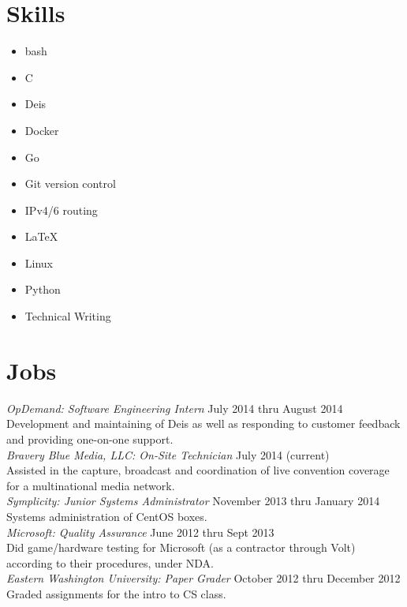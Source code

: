 \documentclass[line, margin]{res}
\begin{document}
\begin{resume}
	\section{Skills}
	\begin{multicols}{3}
		\begin{itemize}
			\item bash
			\item C
			\item Deis
			\item Docker
			\item Go
			\item Git version control
			\item IPv4/6 routing
			\item \LaTeX
			\item Linux
			\item Python
			\item Technical Writing
		\end{itemize}
	\end{multicols}

	\section{Jobs}
	\textit{OpDemand: Software Engineering Intern} \hfill July 2014 thru August 2014\\
	Development and maintaining of Deis as well as responding to customer
	feedback and providing one-on-one support. \\ [6pt]
	\textit{Bravery Blue Media, LLC: On-Site Technician} \hfill July 2014 (current) \\
	Assisted in the capture, broadcast and coordination of live convention
	coverage for a multinational media network. \\ [6pt]
	\textit{Symplicity: Junior Systems Administrator} \hfill November 2013 thru January 2014 \\
	Systems administration of CentOS boxes. \\ [6pt]
	\textit{Microsoft: Quality Assurance} \hfill June 2012 thru Sept 2013 \\
	Did game/hardware testing for Microsoft (as a contractor through Volt)
	according to their procedures, under NDA. \\ [6pt]
	\textit{Eastern Washington University: Paper Grader} \hfill October 2012 thru December 2012 \\
	Graded assignments for the intro to CS class. \\ [12pt]

\end{resume}
\end{document}
